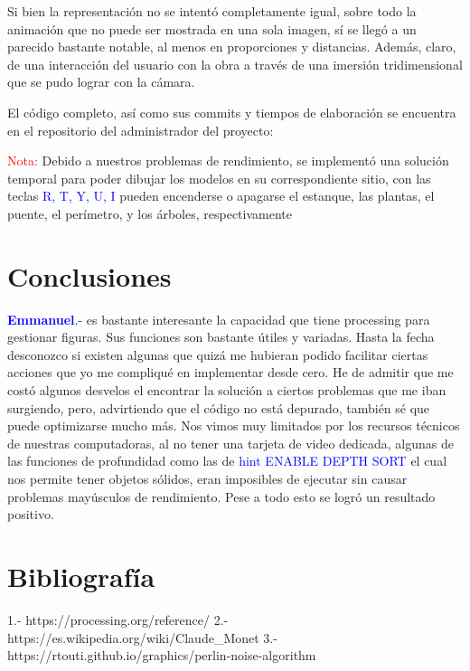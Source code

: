 \documentclass[11pt,a4paper]{article}
\begin{document}
		Si bien la representación no se intentó completamente igual, sobre todo la animación que no puede ser mostrada en una sola imagen, sí se llegó a un parecido bastante notable, al menos en proporciones y distancias. Además, claro, de una interacción del usuario con la obra a través de una imersión tridimensional que se pudo lograr con la cámara.

		El código completo, así como sus commits y tiempos de elaboración se encuentra en el repositorio del administrador del proyecto:
		\begin{center}
		
		\end{center}

		\textcolor{red}{Nota:} Debido a nuestros problemas de rendimiento, se implementó una solución temporal para poder dibujar los modelos en su correspondiente sitio, con las teclas \textcolor{blue}{R, T, Y, U, I} pueden encenderse o apagarse el estanque, las plantas, el puente, el perímetro, y los árboles, respectivamente


\section{Conclusiones}
	\textcolor{blue}{\bf Emmanuel}.- es bastante interesante la capacidad que tiene processing para gestionar figuras. Sus funciones son bastante útiles y variadas. Hasta la fecha desconozco si existen algunas que quizá me hubieran podido facilitar ciertas acciones que yo me compliqué en implementar desde cero. He de admitir que me costó algunos desvelos el encontrar la solución a ciertos problemas que me iban surgiendo, pero, advirtiendo que el código no está depurado, también sé que puede optimizarse mucho más. Nos vimos muy limitados por los recursos técnicos de nuestras computadoras, al no tener una tarjeta de video dedicada, algunas de las funciones de profundidad como las de \textcolor{blue}{hint ENABLE DEPTH SORT } el cual nos permite tener objetos sólidos, eran imposibles de ejecutar sin causar problemas mayúsculos de rendimiento. Pese a todo esto se logró un resultado positivo.
	

\section{Bibliografía}

\begin{verbatim*}

1.- https://processing.org/reference/
2.- https://es.wikipedia.org/wiki/Claude_Monet
3.- https://rtouti.github.io/graphics/perlin-noise-algorithm

\end{verbatim*}
 	
\end{document}
